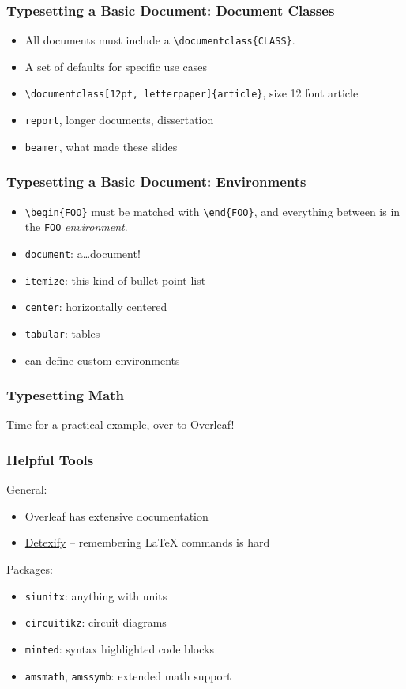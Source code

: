 \documentclass{beamer} \usetheme{Madrid}
\begin{document}
\begin{frame}
    \frametitle{Typesetting a Basic Document: Document Classes}
    \begin{itemize}
        \item All documents must include a \texttt{\textbackslash documentclass\{CLASS\}}.
        \item A set of defaults for specific use cases
        \item \texttt{\textbackslash documentclass[12pt, letterpaper]\{article\}}, size 12 font article
        \item \texttt{report}, longer documents, dissertation
        \item \texttt{beamer}, what made these slides
    \end{itemize}
\end{frame}

\begin{frame}
    \frametitle{Typesetting a Basic Document: Environments}
    \begin{itemize}
        \item \texttt{\textbackslash begin\{FOO\}} must be matched with \texttt{\textbackslash end\{FOO\}}, and everything between is in the \texttt{FOO} \emph{environment}.
        \item \texttt{document}: a\ldots document!
        \item \texttt{itemize}: this kind of bullet point list
        \item \texttt{center}: horizontally centered
        \item \texttt{tabular}: tables
        \item can define custom environments
    \end{itemize}
\end{frame}

\begin{frame}
    \frametitle{Typesetting Math}
    \vfill
    \begin{center}
        Time for a practical example, over to Overleaf!
    \end{center}
    \vfill
\end{frame}

\begin{frame}
    \frametitle{Helpful Tools}
    General:
    \begin{itemize}
        \item Overleaf has extensive documentation
        \item \href{http://detexify.kirelabs.org/classify.html}{Detexify} -- remembering {\LaTeX} commands is hard
    \end{itemize}
    Packages:
    \begin{itemize}
        \item \texttt{siunitx}: anything with units
        \item \texttt{circuitikz}: circuit diagrams
        \item \texttt{minted}: syntax highlighted code blocks
        \item \texttt{amsmath}, \texttt{amssymb}: extended math support
    \end{itemize}
\end{frame}
\end{document}
